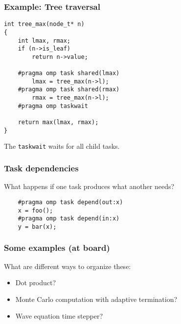 \documentclass{beamer}
\begin{document}
\begin{frame}[fragile]
  \frametitle{Example: Tree traversal}

\begin{lstlisting}
int tree_max(node_t* n)
{
    int lmax, rmax;
    if (n->is_leaf)
        return n->value;
    
    #pragma omp task shared(lmax)
        lmax = tree_max(n->l);
    #pragma omp task shared(rmax)
        rmax = tree_max(n->l);
    #pragma omp taskwait

    return max(lmax, rmax);
}
\end{lstlisting}
The {\tt taskwait} waits for all child tasks.
\end{frame}


\begin{frame}[fragile]
  \frametitle{Task dependencies}

  What happens if one task produces what another needs?
\begin{lstlisting}
    #pragma omp task depend(out:x)
    x = foo();
    #pragma omp task depend(in:x)
    y = bar(x);
\end{lstlisting}

\end{frame}


\begin{frame}
  \frametitle{Some examples (at board)}

  What are different ways to organize these:
  \begin{itemize}
  \item Dot product?
  \item Monte Carlo computation with adaptive termination?
  \item Wave equation time stepper?
  \end{itemize}
\end{frame}
\end{document}
